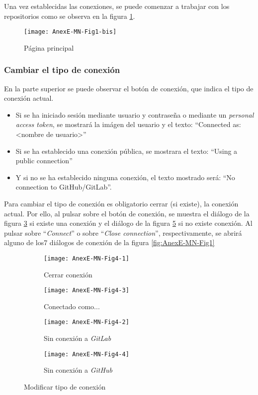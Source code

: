
Una vez establecidas las conexiones, se puede comenzar a trabajar con los repositorios como se observa en la figura \ref{fig:AnexE-MN-Fig1-bis}.

\begin{figure}[!h]
	\centering
	\texttt{[image: AnexE-MN-Fig1-bis]}
	\caption{Página principal}\label{fig:AnexE-MN-Fig1-bis}
\end{figure}
\FloatBarrier

\subsubsection{Cambiar el tipo de conexión}

En la parte superior se puede observar el botón de conexión, que indica el tipo de conexión actual.
\begin{itemize}
	\tightlist
	\item Si se ha iniciado sesión mediante usuario y contraseña o mediante un \textit{personal access token}, se mostrará la imágen del usuario y el texto: ``Connected as: <nombre de usuario>''
	\item Si se ha establecido una conexión pública, se mostrara el texto: ``Using a public connection''
	\item Y si no se ha establecido ninguna conexión, el texto mostrado será: ``No connection to GitHub/GitLab''.
\end{itemize}
Para cambiar el tipo de conexión es obligatorio cerrar (si existe), la conexión actual. Por ello, al pulsar sobre el botón de conexión, se muestra el diálogo de la figura \ref{fig:AnexE-MN-Fig4-1} si existe una conexión y el diálogo de la figura \ref{fig:AnexE-MN-Fig4-2} si no existe conexión. Al pulsar sobre ``\textit{Connect}'' o sobre ``\textit{Close connection}'', respectivamente, se abrirá alguno de los7 diálogos de conexión de la figura \ref{fig:AnexE-MN-Fig1}
\begin{figure}[!h]
	\centering
	\begin{subfigure}{.45\textwidth}
		\centering
		\texttt{[image: AnexE-MN-Fig4-1]}
		\caption{Cerrar conexión}
		\label{fig:AnexE-MN-Fig4-1}
	\end{subfigure}\hfill
	\begin{subfigure}{.45\textwidth}
		\centering
		\texttt{[image: AnexE-MN-Fig4-3]}
		\caption{Conectado como...}
		\label{fig:AnexE-MN-Fig4-1}
	\end{subfigure}\hfill
	\begin{subfigure}{.45\textwidth}
		\centering
		\texttt{[image: AnexE-MN-Fig4-2]}
		\caption{Sin conexión a \textit{GitLab}}
		\label{fig:AnexE-MN-Fig4-2}
	\end{subfigure}\hfill
	\begin{subfigure}{.45\textwidth}
		\centering
		\texttt{[image: AnexE-MN-Fig4-4]}
		\caption{Sin conexión a \textit{GitHub}}
		\label{fig:AnexE-MN-Fig4-2}
	\end{subfigure}\hfill
	\caption{Modificar tipo de conexión}
	\label{fig:AnexE-MN-Fig4}
\end{figure}

